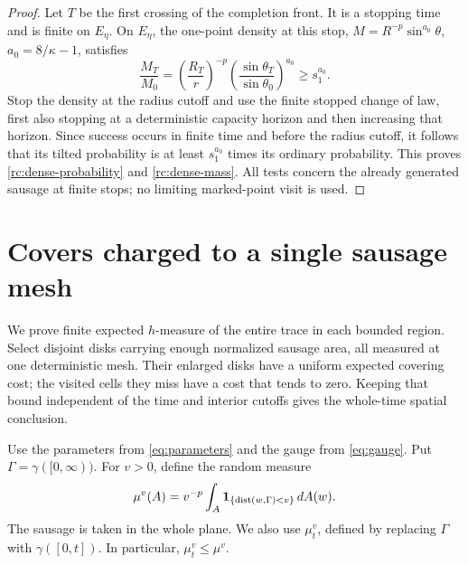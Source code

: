 \documentclass[11pt]{article}
\theoremstyle{definition}
\theoremstyle{remark}
\numberwithin{equation}{section}
\begin{document}
\begin{proof}
Let $T$ be the first crossing of the completion front. It is a stopping
time and is finite on $E_\eta$. On $E_\eta$, the one-point density at
this stop,
$M=R^{-p}\sin^{a_0}\theta$, $a_0=8/\kappa-1$, satisfies
\[
 \frac{M_T}{M_0}
 =\left(\frac{R_T}{r}\right)^{-p}
     \left(\frac{\sin\theta_T}{\sin\theta_0}\right)^{a_0}
 \ge s_1^{a_0}.
\]
Stop the density at the radius cutoff and use the finite stopped
change of law, first also stopping at a deterministic capacity horizon
and then increasing that horizon.  Since success occurs in finite
time and before the radius cutoff, it follows that its tilted
probability is at least $s_1^{a_0}$ times its ordinary probability.
This proves \eqref{rc:dense-probability} and
\eqref{rc:dense-mass}.  All tests concern the already generated
sausage at finite stops; no limiting marked-point visit is used.
\end{proof}


\section{Covers charged to a single sausage mesh}
\label{sec:dense-cover}

We prove finite expected $h$-measure of the entire trace in each bounded
region. Select disjoint disks carrying enough normalized sausage area,
all measured at one deterministic mesh. Their enlarged disks have a
uniform expected covering cost; the visited cells they miss have a cost
that tends to zero. Keeping that bound independent of the time and
interior cutoffs gives the whole-time spatial conclusion.

Use the parameters from \eqref{eq:parameters} and the gauge
from \eqref{eq:gauge}. Put
\(\Gamma=\gamma([0,\infty))\).  For \(v>0\), define the random measure
\begin{equation}
 \mu^v(A)=v^{-p}\int_A
       {\bf1}_{\{\operatorname{dist}(w,\Gamma)<v\}}\,dA(w).
 \label{eq:cover-sausage}
\end{equation}
The sausage is taken in the whole plane.  We also use \(\mu_t^v\),
defined by replacing \(\Gamma\) with \(\gamma([0,t])\).  In particular,
\(\mu_t^v\le\mu^v\).
\end{document}
